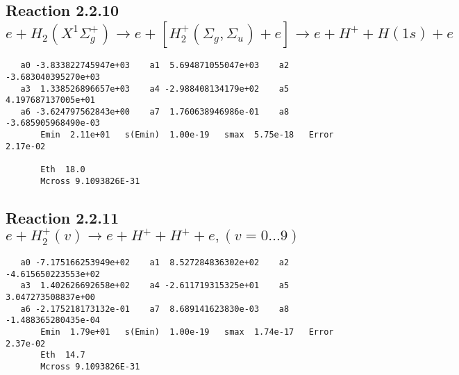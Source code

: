 \documentclass[12pt,dvipdfmx]{article}
\begin{document}
\newpage
\subsection{
Reaction 2.2.10 $e + H_2(X^1\Sigma_g^+) \rightarrow e + [H_2^+(\Sigma_g, \Sigma_u) + e] \rightarrow e + H^+ + H(1s) + e$}
















\begin{small}\begin{verbatim}
   a0 -3.833822745947e+03    a1  5.694871055047e+03    a2 -3.683040395270e+03
   a3  1.338526896657e+03    a4 -2.988408134179e+02    a5  4.197687137005e+01
   a6 -3.624797562843e+00    a7  1.760638946986e-01    a8 -3.685905968490e-03
       Emin  2.11e+01   s(Emin)  1.00e-19   smax  5.75e-18   Error  2.17e-02

       Eth  18.0
       Mcross 9.1093826E-31
\end{verbatim}\end{small}





\newpage
\subsection{
Reaction 2.2.11 $e + H_2^+(v) \rightarrow e + H^+ + H^+ + e, (v=0\ldots 9)$}














\begin{small}\begin{verbatim}
   a0 -7.175166253949e+02    a1  8.527284836302e+02    a2 -4.615650223553e+02
   a3  1.402626692658e+02    a4 -2.611719315325e+01    a5  3.047273508837e+00
   a6 -2.175218173132e-01    a7  8.689141623830e-03    a8 -1.488365280435e-04
       Emin  1.79e+01   s(Emin)  1.00e-19   smax  1.74e-17   Error  2.37e-02
       Eth  14.7
       Mcross 9.1093826E-31
\end{verbatim}\end{small}
\end{document}
